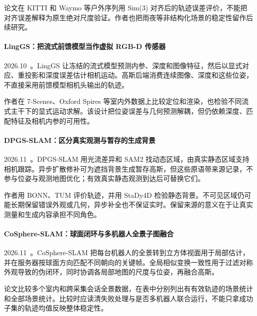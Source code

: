 论文在 KITTI 和 Waymo 等户外序列用 Sim(3) 对齐后的轨迹误差评价，不能把对齐误差解释为原生绝对尺度验证。作者也把雨夜等非结构化场景的稳定性留作后续研究。

\paragraph{LingGS：把流式前馈模型当作虚拟 RGB-D 传感器}
2026.10~\cite{2610_36853}。LingGS 让冻结的流式模型预测内参、深度和图像特征，然后以显式对应、重投影和深度误差估计相机运动。高斯后端消费连续图像、深度和这些位姿，不直接采用前馈模型相机头输出的轨迹。

作者在 7-Scenes、Oxford Spires 等室内外数据上比较定位和渲染，也检验不同流式主干下的显式运动求解。该设计把位姿误差与几何预测解耦，但仍依赖深度、匹配特征及相机内参的可用性。

\paragraph{DPGS-SLAM：区分真实观测与暂存的生成背景}
2026.11~\cite{2611_12038}。DPGS-SLAM 用光流差异和 SAM2 找动态区域，由真实静态区域支持相机跟踪。异步扩散修补可为遮挡背景生成暂存高斯，但这些原语带来源记录，不参与位姿与观测地图优化；有效真实静态观测到达后可替换它们。

作者用 BONN、TUM 评价轨迹，并用 StaDy4D 检验静态背景。不可见区域仍可能长期保留错误外观或几何，异步补全也不保证实时。保留来源的意义在于让真实测量和生成内容承担不同角色。

\paragraph{CoSphere-SLAM：球面闭环与多机器人全景子图融合}
2026.11~\cite{2611_22235}。CoSphere-SLAM 把每台机器人的全景转到立方体视面用于局部估计，并在服务器按球面方向匹配不同朝向的关键帧。全局相似变换一致性用于过滤对称外观导致的伪闭环，同时协调各局部地图的尺度与位姿，再融合高斯。

论文比较多个室内和跨采集会话全景数据，在表中分别列出有有效轨迹的场景统计和全部场景统计。比较时应读清失败处理与是否多机器人联合运行，不能只拿成功子集的轨迹均值反映整体稳定性。
